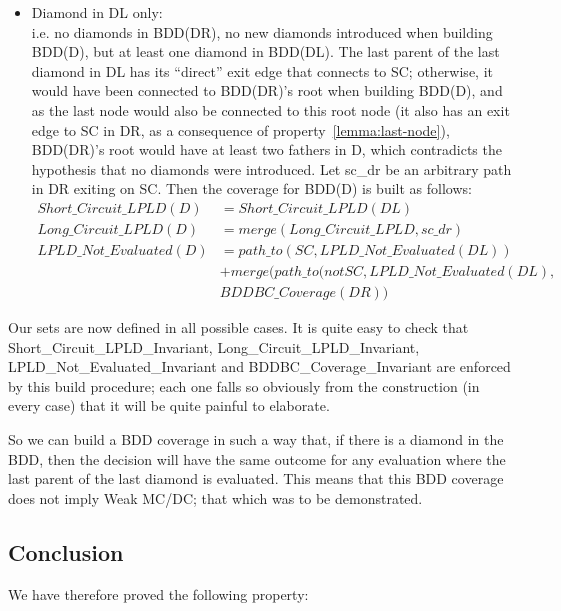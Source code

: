 \documentclass[a4paper,12pt,twoside]{article}
\begin{document}
\begin{description}
\begin{itemize}
  \item Diamond in DL only:\\
    i.e. no diamonds in BDD(DR), no new diamonds introduced when
    building BDD(D), but at least one diamond in BDD(DL).  The last
    parent of the last diamond in DL has its ``direct'' exit edge
    that connects to SC; otherwise, it would have been connected to
    BDD(DR)'s root when building BDD(D), and as the last node would
    also be connected to this root node (it also has an exit edge to
    SC in DR, as a consequence of property~\ref{lemma:last-node}), BDD(DR)'s
    root would have at least two fathers in D, which contradicts the
    hypothesis that no diamonds were introduced.  Let sc\_dr be an
    arbitrary path in DR exiting on SC.  Then the coverage for BDD(D)
    is built as follows:
    \begin{align*}
    Short\_Circuit\_LPLD(D) & = Short\_Circuit\_LPLD(DL)\\
    Long\_Circuit\_LPLD(D)  & = merge(Long\_Circuit\_LPLD, {sc\_dr})\\
    LPLD\_Not\_Evaluated(D) & = path\_to(SC, LPLD\_Not\_Evaluated(DL))\\
                         & + merge(path\_to(not SC, LPLD\_Not\_Evaluated(DL),\\
                         & BDDBC\_Coverage(DR))
    \end{align*}
  \end{itemize}
\end{description}

Our sets are now defined in all possible cases. It is quite easy to
check that Short\_Circuit\_LPLD\_Invariant,
Long\_Circuit\_LPLD\_Invariant, LPLD\_Not\_Evaluated\_Invariant and
BDDBC\_Coverage\_Invariant are enforced by this build procedure; each
one falls so obviously from the construction (in every case) that it
will be quite painful to elaborate.

So we can build a BDD coverage in such a way that, if there is a
diamond in the BDD, then the decision will have the same outcome for
any evaluation where the last parent of the last diamond is
evaluated. This means that this BDD coverage does not imply Weak
MC/DC; that which was to be demonstrated.

\subsection{Conclusion}

We have therefore proved the following property:
\end{document}
